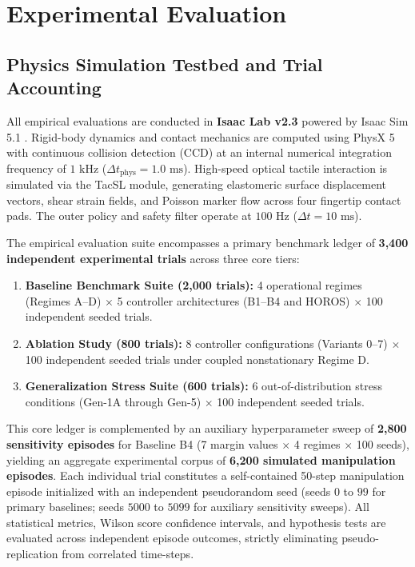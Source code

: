 \section{Experimental Evaluation}
\label{sec:experimental_evaluation}

\subsection{Physics Simulation Testbed and Trial Accounting}
All empirical evaluations are conducted in \textbf{Isaac Lab v2.3} powered by Isaac Sim 5.1 \cite{isaacsim2024}. Rigid-body dynamics and contact mechanics are computed using PhysX 5 with continuous collision detection (CCD) at an internal numerical integration frequency of $1\text{ kHz}$ ($\Delta t_{\text{phys}} = 1.0\text{ ms}$). High-speed optical tactile interaction is simulated via the TacSL module, generating elastomeric surface displacement vectors, shear strain fields, and Poisson marker flow across four fingertip contact pads. The outer policy and safety filter operate at $100\text{ Hz}$ ($\Delta t = 10\text{ ms}$).

The empirical evaluation suite encompasses a primary benchmark ledger of \textbf{3,400 independent experimental trials} across three core tiers:
\begin{enumerate}
    \item \textbf{Baseline Benchmark Suite (2,000 trials):} 4 operational regimes (Regimes A--D) $\times$ 5 controller architectures (B1--B4 and HOROS) $\times$ 100 independent seeded trials.
    \item \textbf{Ablation Study (800 trials):} 8 controller configurations (Variants 0--7) $\times$ 100 independent seeded trials under coupled nonstationary Regime D.
    \item \textbf{Generalization Stress Suite (600 trials):} 6 out-of-distribution stress conditions (Gen-1A through Gen-5) $\times$ 100 independent seeded trials.
\end{enumerate}
This core ledger is complemented by an auxiliary hyperparameter sweep of \textbf{2,800 sensitivity episodes} for Baseline B4 (7 margin values $\times$ 4 regimes $\times$ 100 seeds), yielding an aggregate experimental corpus of \textbf{6,200 simulated manipulation episodes}. Each individual trial constitutes a self-contained 50-step manipulation episode initialized with an independent pseudorandom seed (seeds $0$ to $99$ for primary baselines; seeds $5000$ to $5099$ for auxiliary sensitivity sweeps). All statistical metrics, Wilson score confidence intervals, and hypothesis tests are evaluated across independent episode outcomes, strictly eliminating pseudo-replication from correlated time-steps.

